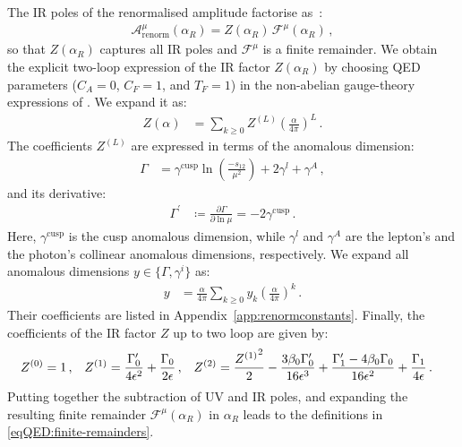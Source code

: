 \documentclass[main.tex]{subfiles}
\begin{document}
The IR poles of the renormalised amplitude factorise as~\cite{Catani:1998bh, Gardi:2009qi, Gardi:2009zv, Becher:2009cu, Becher:2009qa}:
\begin{align}
 \mathcal{A}^\mu_\text{renorm}(\alpha_R) = Z(\alpha_R) \,  \mathcal{F}^\mu(\alpha_R) \,,
\end{align}
so that $ Z(\alpha_R)$ captures all IR poles and $\mathcal{F}^\mu$ is a finite remainder.
We obtain the explicit two-loop expression of the IR factor $Z(\alpha_R)$ by
choosing QED parameters ($C_A=0$, $C_F=1$, and $T_F=1$) in the non-abelian gauge-theory expressions of . We expand it as:
\begin{align}
    Z(\alpha) &= \sum_{k\ge0} Z^{(L)} \left(\frac{\alpha}{4\pi}\right)^L \,.
\end{align}
The coefficients $Z^{(L)}$ are expressed in terms of the anomalous dimension:
\begin{align}
    \Gamma &= \gamma^\text{cusp}\ln\left(\frac{-s_{12}}{\mu^2}\right)+2\gamma^l+\gamma^A \,,
\end{align}
and its derivative:
\begin{align}
    \Gamma^\prime &\coloneqq \frac{\partial\Gamma}{\partial\ln\mu} = -2\gamma^\text{cusp} \,.
\end{align}
Here, $\gamma^\text{cusp}$ is the cusp anomalous dimension, while $\gamma^l$ and $\gamma^A$ are the lepton's and the photon's collinear anomalous dimensions, respectively.
We expand all anomalous dimensions $y\in\{\Gamma,\gamma^i\}$ as:
\begin{align}
    y &= \frac{\alpha}{4\pi} \sum_{k\ge0} y_k \left(\frac{\alpha}{4\pi}\right)^k \,.
\end{align}
Their coefficients are listed in Appendix~\ref{app:renormconstants}. Finally, the coefficients of the IR factor $Z$ up to two loop are given by:
\begin{align}
    \label{eq:ir-pole-coeffs}
    Z^{(0)} &= 1 \,, &
    Z^{(1)} &= \frac{\Gamma_0^\prime}{4\epsilon^2}+\frac{\Gamma_0}{2\epsilon} \,, &
    Z^{(2)} &= \frac{{Z^{(1)}}^2}{2} -\frac{3\beta_0\Gamma_0^\prime}{16\epsilon^3}+\frac{\Gamma_1^\prime-4\beta_0\Gamma_0}{16\epsilon^2}+\frac{\Gamma_1}{4\epsilon} \,.
\end{align}
Putting together the subtraction of UV and IR poles, and expanding the resulting finite remainder $\mathcal{F}^{\mu}(\alpha_R)$ in $\alpha_R$ leads to the definitions in \cref{eqQED:finite-remainders}.

\renewcommand{\theequation}{D.\arabic{equation}}
\end{document}
